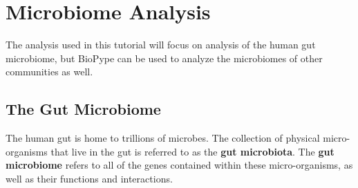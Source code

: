 
%





\chapter{Microbiome Analysis}
The analysis used in this tutorial will focus on analysis of the human gut microbiome, but BioPype can be used to analyze the microbiomes of other communities as well.
\section{The Gut Microbiome}
%
%
The human gut is home to trillions of microbes. The collection of physical micro-organisms that live in the gut is referred to as the \textbf{gut microbiota}. The \textbf{gut microbiome} refers to all of the genes contained within these micro-organisms, as well as their functions and interactions.

